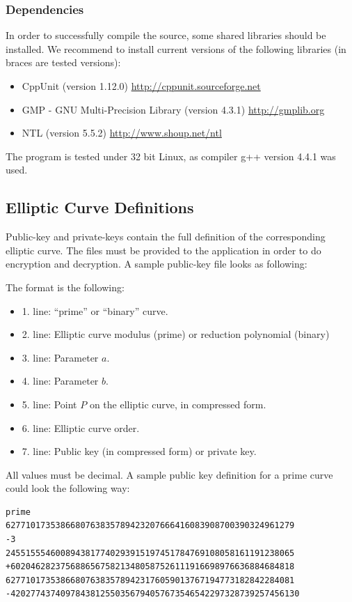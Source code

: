 \documentclass[11pt,english]{article}
\begin{document}
\subsubsection{Dependencies}
In order to successfully compile the source, some shared libraries should be installed. We recommend to install current versions of the following libraries (in braces are tested versions):

\begin{itemize}
 \item CppUnit (version 1.12.0) \url{http://cppunit.sourceforge.net}
 \item GMP - GNU Multi-Precision Library (version 4.3.1) \url{http://gmplib.org}
 \item NTL (version 5.5.2) \url{http://www.shoup.net/ntl}
\end{itemize}

The program is tested under 32 bit Linux, as compiler g++ version 4.4.1 was used.

\subsection{Elliptic Curve Definitions}
\label{ecdefinitions}
Public-key and private-keys contain the full definition of the corresponding elliptic curve. The files must be provided to the application in order to do encryption and decryption. A sample public-key file looks as following:

The format is the following:

\begin{itemize}
 \item 1. line: ``prime'' or ``binary'' curve.
 \item 2. line: Elliptic curve modulus (prime) or reduction polynomial (binary)
 \item 3. line: Parameter $a$.
 \item 4. line: Parameter $b$.
 \item 5. line: Point $P$ on the elliptic curve, in compressed form.
 \item 6. line: Elliptic curve order.
 \item 7. line: Public key (in compressed form) or private key.
\end{itemize}

All values must be decimal. A sample public key definition for a prime curve could look the following way:

\begin{verbatim}
prime
6277101735386680763835789423207666416083908700390324961279
-3
2455155546008943817740293915197451784769108058161191238065
+602046282375688656758213480587526111916698976636884684818
6277101735386680763835789423176059013767194773182842284081
-4202774374097843812550356794057673546542297328739257456130
\end{verbatim}
\end{document}
